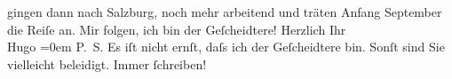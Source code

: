 \begin{ledgroupsized}[t]{13cm}
                    gingen dann {\pb}nach Salzburg, noch mehr arbeitend und träten
                        Anfang September die Reiſe an. Mir folgen, ich bin der
                    Geſcheidtere!\pend
           \pstart
           Herzlich Ihr{\\[\baselineskip]}\spacefill\mbox{Hugo}\pend
           \leftskip=0em{}\pstart
           \noindent{}\textsc{P. S.}\pend
           \pstart
           Es iſt nicht ernſt, daſs ich der Geſcheidtere bin. Sonſt sind Sie vielleicht
                        beleidigt.\pend
           \pstart
           \centering{}{\pb}Immer ſchreiben!\pend
           \endnumbering{}\end{ledgroupsized}  \newcommand{\dateiname}{L00949}\newcommand{\titel}{Hugo von Hofmannsthal an Arthur Schnitzler, 20. 7. [1899]}\newcommand{\editorInnen}{Martin Anton Müller und Gerd-Hermann Susen}
      